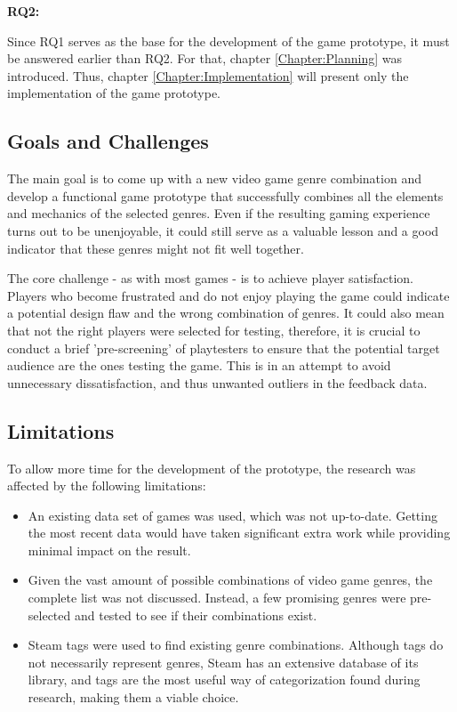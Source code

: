\textbf{RQ2:} \researchQuestionTwo

Since RQ1 serves as the base for the development of the game prototype, it must be answered earlier than RQ2. For that, chapter \ref{Chapter:Planning} was introduced. Thus, chapter \ref{Chapter:Implementation} will present only the implementation of the game prototype.  



\subsection{Goals and Challenges}

The main goal is to come up with a new video game genre combination and develop a functional game prototype that successfully combines all the elements and mechanics of the selected genres. Even if the resulting gaming experience turns out to be unenjoyable, it could still serve as a valuable lesson and a good indicator that these genres might not fit well together.

The core challenge - as with most games - is to achieve player satisfaction. Players who become frustrated and do not enjoy playing the game could indicate a potential design flaw and the wrong combination of genres. It could also mean that not the right players were selected for testing, therefore, it is crucial to conduct a brief 'pre-screening' of playtesters to ensure that the potential target audience are the ones testing the game. This is in an attempt to avoid unnecessary dissatisfaction, and thus unwanted outliers in the feedback data.



\subsection{Limitations} \label{Section:Limitations}

To allow more time for the development of the prototype, the research was affected by the following limitations:

\begin{itemize}
    \item An existing data set of games was used, which was not up-to-date. Getting the most recent data would have taken significant extra work while providing minimal impact on the result.
    \item Given the vast amount of possible combinations of video game genres, the complete list was not discussed. Instead, a few promising genres were pre-selected and tested to see if their combinations exist.
    \item Steam tags were used to find existing genre combinations. Although tags do not necessarily represent genres, Steam has an extensive database of its library, and tags are the most useful way of categorization found during research, making them a viable choice.
\end{itemize}

